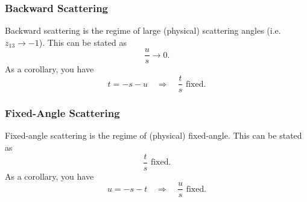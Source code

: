 \subsubsection{Backward Scattering}
Backward scattering is the regime of large (physical) scattering angles (i.e. $z_{13} \rightarrow -1$). This can be stated as
\begin{equation}
	\frac{u}{s} \rightarrow 0.
\end{equation}
As a corollary, you have
\begin{equation}
	t = - s - u \quad \Longrightarrow \quad \frac{t}{s} \text{ fixed}.
\end{equation}
\subsubsection{Fixed-Angle Scattering}
Fixed-angle scattering is the regime of (physical) fixed-angle. This can be stated as
\begin{equation}
	\frac{t}{s} \text{ fixed}.
\end{equation}
As a corollary, you have
\begin{equation}
	u = - s - t \quad \Longrightarrow \quad \frac{u}{s} \text{ fixed}.
\end{equation}